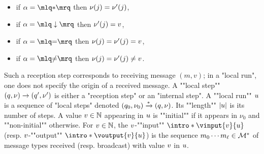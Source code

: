 	\begin{minipage}[t]{6cm}
		\begin{itemize}
			\item if $\anact = \quotemarks{\dummyact}$ 
			then $\nu(j) = \nu'(j)$,
			\item if $\anact = \quotemarks{\enregact}$ then $\nu'(j) = v$,
		\end{itemize}
	\end{minipage}
	\begin{minipage}[t]{6cm}
		\begin{itemize}
			\item if $\anact = \quotemarks{\eqtestact}$ then $\nu(j) = \nu'(j)= v$,
			\item if $\anact = \quotemarks{\diseqtestact}$ then $\nu(j) = \nu'(j) \ne v$.
		\end{itemize}
	\end{minipage}
	Such a reception step corresponds to receiving message $(m,v)$; in a "local run", one does not specify the origin of a received message. 
	\AP A ""local step"" $(q,\nu) \xrightarrow{} (q',\nu')$ is either a "reception step" or an "internal step". 
	\AP A ""local run"" $u$ is a sequence of "local steps" denoted $(q_0, \nu_0) \xrightarrow{*} (q, \nu)$. Its ""length"" $|u|$ is its number of steps. %
	A value $v \in \mathbb{N}$ appearing in $u$ is ""initial"" if it appears in $\nu_0$ and ""non-initial"" otherwise. 
	For $v \in \mathbb{N}$, the $v$-""input"" $\intro*\vinput{\aval}{\localrun}$ (resp. $v$-""output"" $\intro*\voutput{\aval}{\localrun}$) is the sequence $m_0 \cdots m_{\ell} \in \mathcal{M}^*$ of message types received (resp. broadcast) with value $v$ in $u$.

